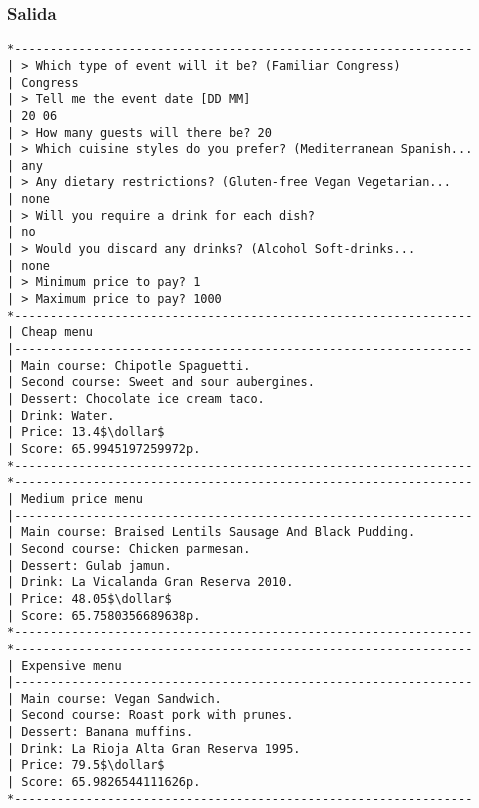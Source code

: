 \documentclass{article}
\newcommand{\dollar}{\mbox{\textdollar}}
\begin{document}
\subsubsection{Salida}
\begin{lstlisting}
*----------------------------------------------------------------
| > Which type of event will it be? (Familiar Congress)
| Congress
| > Tell me the event date [DD MM]
| 20 06
| > How many guests will there be? 20
| > Which cuisine styles do you prefer? (Mediterranean Spanish...
| any
| > Any dietary restrictions? (Gluten-free Vegan Vegetarian...
| none
| > Will you require a drink for each dish?
| no
| > Would you discard any drinks? (Alcohol Soft-drinks...
| none
| > Minimum price to pay? 1
| > Maximum price to pay? 1000
*----------------------------------------------------------------
| Cheap menu
|----------------------------------------------------------------
| Main course: Chipotle Spaguetti.
| Second course: Sweet and sour aubergines.
| Dessert: Chocolate ice cream taco.
| Drink: Water.
| Price: 13.4$\dollar$
| Score: 65.9945197259972p.
*----------------------------------------------------------------
*----------------------------------------------------------------
| Medium price menu
|----------------------------------------------------------------
| Main course: Braised Lentils Sausage And Black Pudding.
| Second course: Chicken parmesan.
| Dessert: Gulab jamun.
| Drink: La Vicalanda Gran Reserva 2010.
| Price: 48.05$\dollar$
| Score: 65.7580356689638p.
*----------------------------------------------------------------
*----------------------------------------------------------------
| Expensive menu
|----------------------------------------------------------------
| Main course: Vegan Sandwich.
| Second course: Roast pork with prunes.
| Dessert: Banana muffins.
| Drink: La Rioja Alta Gran Reserva 1995.
| Price: 79.5$\dollar$
| Score: 65.9826544111626p.
*----------------------------------------------------------------
\end{lstlisting}
\end{document}
